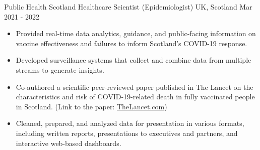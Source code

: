 \cventry
{Public Health Scotland} %
{Healthcare Scientist (Epidemiologist)} %
{UK, Scotland} %
{Mar 2021 - 2022} %
{
\begin{itemize}
    \item Provided real-time data analytics, guidance, and public-facing information on 
vaccine effectiveness and failures to inform Scotland's COVID-19 response.
   \item Developed surveillance systems that collect and combine data from 
   multiple streams to generate insights.
   \item Co-authored a scientific peer-reviewed paper published in The Lancet on the characteristics and risk of COVID-19-related death in fully vaccinated people in Scotland. (Link to the paper: \href{https://www.thelancet.com/journals/lancet/article/PIIS0140-6736(21)02316-3/fulltext}{TheLancet.com})
   \item Cleaned, prepared, and analyzed data for presentation in various 
   formats, including written reports, presentations to executives and 
   partners, and interactive web-based dashboards.
\end{itemize}
}

